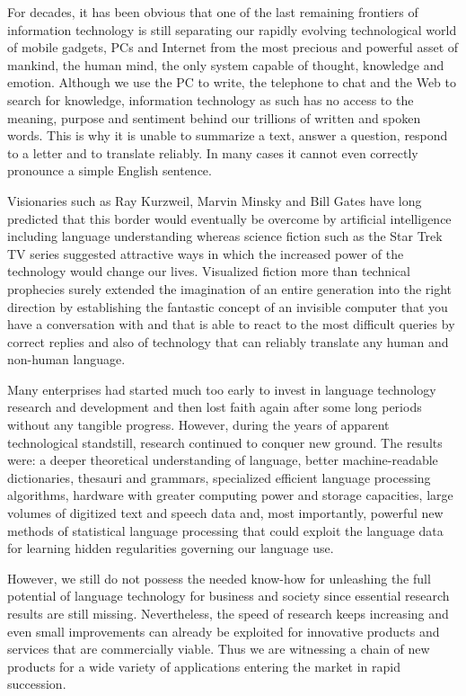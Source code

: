 \begin{multicols}{2}
For decades, it has been obvious that one of the last remaining frontiers of information technology is still separating our rapidly evolving technological world of mobile gadgets, PCs and Internet from the most precious and powerful asset of mankind, the human mind, the only system capable of thought, knowledge and emotion. Although we use the PC to write, the telephone to chat and the Web to search for knowledge, information technology as such has no access to the meaning, purpose and sentiment behind our trillions of written and spoken words. This is why it is unable to summarize a text, answer a question, respond to a letter and to translate reliably. In many cases it cannot even correctly pronounce a simple English sentence.   

Visionaries such as Ray Kurzweil, Marvin Minsky and Bill Gates have long predicted that this border would eventually be overcome by artificial intelligence including language understanding whereas science fiction such as the Star Trek TV series suggested attractive ways in which the increased power of the technology would change our lives. Visualized fiction more than technical prophecies surely extended the imagination of an entire generation into the right direction by establishing the fantastic concept of an invisible computer that you have a conversation with and that is able to react to the most difficult queries by correct replies and also of technology that can reliably translate any human and non-human language.

Many enterprises had started much too early to invest in language technology research and development and then lost faith again after some long periods without any tangible progress. However, during the years of apparent technological standstill, research continued to conquer new ground. The results were: a deeper theoretical understanding of language, better machine-readable dictionaries, thesauri and grammars, specialized efficient language processing algorithms, hardware with greater computing power and storage capacities, large volumes of digitized text and speech data and, most importantly, powerful new methods of statistical language processing that could exploit the language data for learning hidden regularities governing our language use.

However, we still do not possess the needed know-how for unleashing the full potential of language technology for business and society since essential research results are still missing. Nevertheless, the speed of research keeps increasing and even small improvements can already be exploited for innovative products and services that are commercially viable. Thus we are witnessing a chain of new products for a wide variety of applications entering the market in rapid succession. 


\end{multicols}
